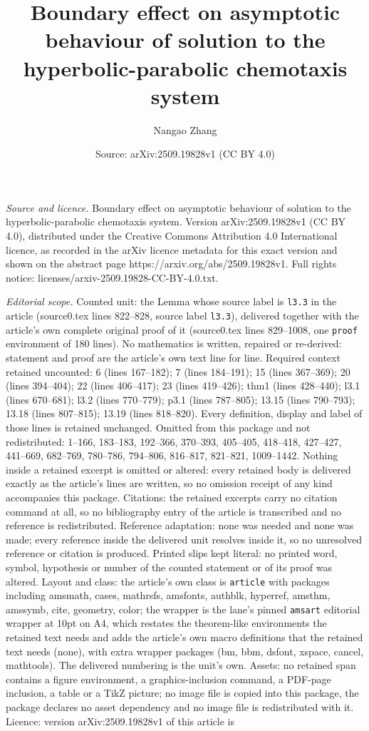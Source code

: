 \documentclass[10pt,a4paper]{amsart}
\title[Boundary effect on asymptotic behaviour of solution to the h]{Boundary effect on asymptotic behaviour of solution to the hyperbolic-parabolic chemotaxis system}
\author{Nangao Zhang}
\date{Source: arXiv:2509.19828v1 (CC BY 4.0)}
\begin{document}
\maketitle

\noindent\emph{Source and licence.} Boundary effect on asymptotic behaviour of solution to the hyperbolic-parabolic chemotaxis system. Version arXiv:2509.19828v1 (CC BY 4.0), distributed under the Creative Commons Attribution 4.0 International licence, as recorded in the arXiv licence metadata for this exact version and shown on the abstract page https://arxiv.org/abs/2509.19828v1. Full rights notice: licenses/arxiv-2509.19828-CC-BY-4.0.txt.\par\smallskip

\noindent\textit{Editorial scope.} Counted unit: the Lemma whose source label is \texttt{l3.3} in the article (source0.tex lines 822--828, source label \texttt{l3.3}), delivered together with the article's own complete original proof of it (source0.tex lines 829--1008, one \texttt{proof} environment of 180 lines). No mathematics is written, repaired or re-derived: statement and proof are the article's own text line for line. Required context retained uncounted: 6 (lines 167--182); 7 (lines 184--191); 15 (lines 367--369); 20 (lines 394--404); 22 (lines 406--417); 23 (lines 419--426); thm1 (lines 428--440); l3.1 (lines 670--681); l3.2 (lines 770--779); p3.1 (lines 787--805); 13.15 (lines 790--793); 13.18 (lines 807--815); 13.19 (lines 818--820). Every definition, display and label of those lines is retained unchanged. Omitted from this package and not redistributed: 1--166, 183--183, 192--366, 370--393, 405--405, 418--418, 427--427, 441--669, 682--769, 780--786, 794--806, 816--817, 821--821, 1009--1442. Nothing inside a retained excerpt is omitted or altered: every retained body is delivered exactly as the article's lines are written, so no omission receipt of any kind accompanies this package. Citations: the retained excerpts carry no citation command at all, so no bibliography entry of the article is transcribed and no reference is redistributed. Reference adaptation: none was needed and none was made; every reference inside the delivered unit resolves inside it, so no unresolved reference or citation is produced. Printed slips kept literal: no printed word, symbol, hypothesis or number of the counted statement or of its proof was altered. Layout and class: the article's own class is \texttt{article} with packages including amsmath, cases, mathrsfs, amsfonts, authblk, hyperref, amsthm, amssymb, cite, geometry, color; the wrapper is the lane's pinned \texttt{amsart} editorial wrapper at 10pt on A4, which restates the theorem-like environments the retained text needs and adds the article's own macro definitions that the retained text needs (none), with extra wrapper packages (bm, bbm, dsfont, xspace, cancel, mathtools). The delivered numbering is the unit's own. Assets: no retained span contains a figure environment, a graphics-inclusion command, a PDF-page inclusion, a table or a TikZ picture; no image file is copied into this package, the package declares no asset dependency and no image file is redistributed with it. Licence: version arXiv:2509.19828v1 of this article is 
\end{document}

